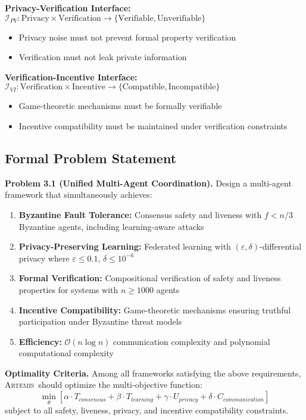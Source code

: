 \documentclass[conference]{IEEEtran}
\newcommand{\artemis}{\textsc{Artemis}}
\newcommand{\bigO}{\mathcal{O}}
\begin{document}
\textbf{Privacy-Verification Interface:} $\mathcal{I}_{PV}: \text{Privacy} \times \text{Verification} \rightarrow \{\text{Verifiable}, \text{Unverifiable}\}$
\begin{itemize}
    \item Privacy noise must not prevent formal property verification
    \item Verification must not leak private information
\end{itemize}

\textbf{Verification-Incentive Interface:} $\mathcal{I}_{VI}: \text{Verification} \times \text{Incentive} \rightarrow \{\text{Compatible}, \text{Incompatible}\}$
\begin{itemize}
    \item Game-theoretic mechanisms must be formally verifiable
    \item Incentive compatibility must be maintained under verification constraints
\end{itemize}

\subsection{Formal Problem Statement}

\textbf{Problem 3.1 (Unified Multi-Agent Coordination).} Design a multi-agent framework that simultaneously achieves:

\begin{enumerate}
    \item \textbf{Byzantine Fault Tolerance:} Consensus safety and liveness with $f < n/3$ Byzantine agents, including learning-aware attacks
    \item \textbf{Privacy-Preserving Learning:} Federated learning with $(\varepsilon, \delta)$-differential privacy where $\varepsilon \leq 0.1$, $\delta \leq 10^{-6}$
    \item \textbf{Formal Verification:} Compositional verification of safety and liveness properties for systems with $n \geq 1000$ agents
    \item \textbf{Incentive Compatibility:} Game-theoretic mechanisms ensuring truthful participation under Byzantine threat models
    \item \textbf{Efficiency:} $\bigO(n \log n)$ communication complexity and polynomial computational complexity
\end{enumerate}

\textbf{Optimality Criteria.} Among all frameworks satisfying the above requirements, \artemis\ should optimize the multi-objective function:
$$\min_{\theta} \left[ \alpha \cdot T_{consensus} + \beta \cdot T_{learning} + \gamma \cdot U_{privacy} + \delta \cdot C_{communication} \right]$$
subject to all safety, liveness, privacy, and incentive compatibility constraints.
\end{document}
